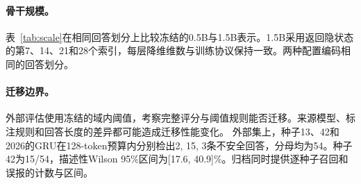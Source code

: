 \paragraph{骨干规模。}表~\ref{tab:scale}在相同回答划分上比较冻结的0.5B与1.5B表示。1.5B采用返回隐状态的第7、14、21和28个索引，每层降维维数与训练协议保持一致。两种配置编码相同的回答划分。



\paragraph{迁移边界。}外部评估使用冻结的域内阈值，考察完整评分与阈值规则能否迁移。来源模型、标注规则和回答长度的差异都可能造成迁移性能变化。
外部集上，种子13、42和2026的GRU在128-token预算内分别检出2, 15, 3条不安全回答，分母均为54。种子42为15/54，描述性Wilson 95\%区间为[17.6, 40.9]\%。归档同时提供逐种子召回和误报的计数与区间。
